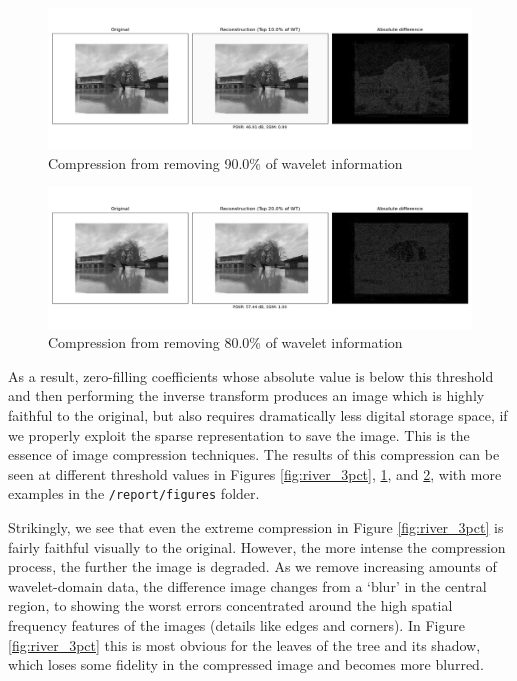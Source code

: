 \documentclass[12pt]{article}
\begin{document}
\begin{figure}[htp]
    \includegraphics[scale=0.45, center]{figures/river_img_compressed_0.100.png}
    \caption{Compression from removing 90.0\% of wavelet information}
    \label{fig:river_10pct}
\end{figure}

\begin{figure}[htp]
    \includegraphics[scale=0.45, center]{figures/river_img_compressed_0.200.png}
    \caption{Compression from removing 80.0\% of wavelet information}
    \label{fig:river_20pct}
\end{figure}

As a result, zero-filling coefficients whose absolute value is below this threshold and then performing the inverse transform produces an image which is highly faithful to the original,
but also requires dramatically less digital storage space, if we properly exploit the sparse representation to save the image.
This is the essence of image compression techniques.
The results of this compression can be seen at different threshold values in Figures \ref{fig:river_3pct}, \ref{fig:river_10pct}, and \ref{fig:river_20pct},
with more examples in the \texttt{/report/figures} folder.

Strikingly, we see that even the extreme compression in Figure \ref{fig:river_3pct} is fairly faithful visually to the original.
However, the more intense the compression process, the further the image is degraded.
As we remove increasing amounts of wavelet-domain data, the difference image changes from a `blur' in the central region,
to showing the worst errors concentrated around the high spatial frequency features of the images (details like edges and corners).
In Figure \ref{fig:river_3pct} this is most obvious for the leaves of the tree and its shadow,
which loses some fidelity in the compressed image and becomes more blurred.
\end{document}
